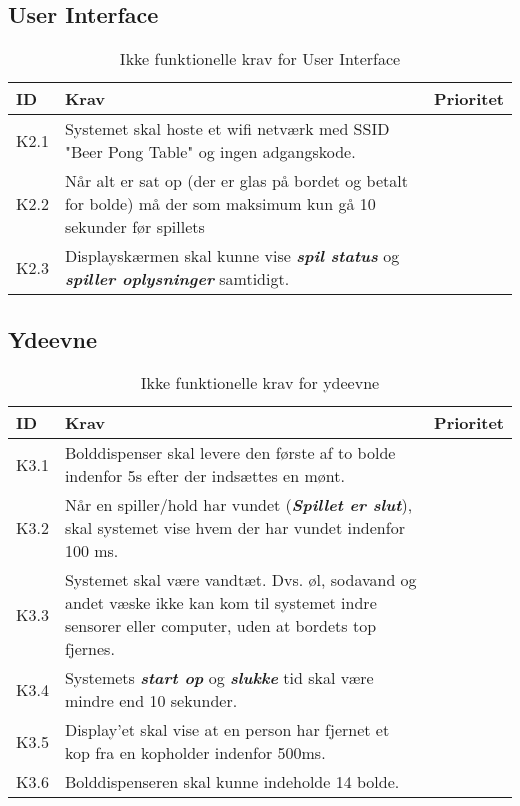 \documentclass[Kravspecifikation/Kravspec_Main.tex]{subfiles}
\begin{document}
\subsection{User Interface}
\begin{table}[H]
\begin{tabular}{|L{0.1\textwidth}|L{0.75\textwidth}|L{0.15\textwidth}|}
\hline
\textbf{ID} & \textbf{Krav} & \textbf{Prioritet} \\ \hline
K2.1 & Systemet skal hoste et wifi netværk med SSID "Beer Pong Table" og ingen adgangskode. & \\ \hline
K2.2 & Når alt er sat op (der er glas på bordet og betalt for bolde) må der som maksimum kun gå 10 sekunder før spillets &  \\ \hline
K2.3 & Displayskærmen skal kunne vise \textit{\textbf{spil status}} og \textit{\textbf{spiller oplysninger}} samtidigt. & \\ \hline
\end{tabular}
\caption{Ikke funktionelle krav for User Interface}
\label{tab:user_interface}
\end{table}

\subsection{Ydeevne}
\begin{table}[H]
\begin{tabular}{|L{0.1\textwidth}|L{0.75\textwidth}|L{0.15\textwidth}|}
\hline
\textbf{ID} & \textbf{Krav} & \textbf{Prioritet} \\ \hline
K3.1 & Bolddispenser skal levere den første af to bolde indenfor 5s efter der indsættes en mønt. &  \\ \hline
K3.2 & Når en spiller/hold har vundet (\textit{\textbf{Spillet er slut}}), skal systemet vise hvem der har vundet indenfor 100 ms. &  \\ \hline
K3.3 & Systemet skal være vandtæt. Dvs. øl, sodavand og andet væske ikke kan kom til systemet indre sensorer eller computer, uden at bordets top fjernes. &  \\ \hline
K3.4 & Systemets \textbf{\textit{start op}} og \textbf{\textit{slukke}} tid skal være mindre end 10 sekunder. &  \\ \hline
K3.5 & Display'et skal vise at en person har fjernet et kop fra en kopholder indenfor 500ms. &  \\ \hline
K3.6 & Bolddispenseren skal kunne indeholde 14 bolde. & \\ \hline
\end{tabular}
\caption{Ikke funktionelle krav for ydeevne}
\label{tab:ydeevne}
\end{table}
\end{document}
